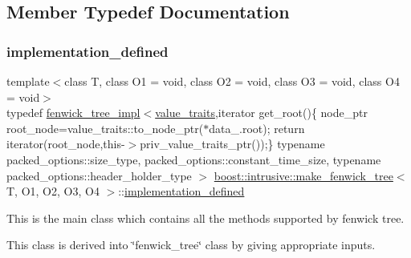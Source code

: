 \subsection{Member Typedef Documentation}
\mbox{\label{structboost_1_1intrusive_1_1make__fenwick__tree_af7a268a01bc7f0ae30cabfd6bf2be546}} 
\subsubsection{\texorpdfstring{implementation\+\_\+defined}{implementation\_defined}}
{\footnotesize\ttfamily template$<$class T, class O1 = void, class O2 = void, class O3 = void, class O4 = void$>$ \\
typedef \hyperlink{classboost_1_1intrusive_1_1fenwick__tree__impl}{fenwick\+\_\+tree\+\_\+impl}$<$\hyperlink{structboost_1_1intrusive_1_1make__fenwick__tree_a3ee00a7f2c43d65e29ad42d24f33235a}{value\+\_\+traits},iterator get\+\_\+root()\{ node\+\_\+ptr root\+\_\+node=value\+\_\+traits\+::to\+\_\+node\+\_\+ptr($\ast$data\+\_\+.\+root); return iterator(root\+\_\+node,this-\/$>$priv\+\_\+value\+\_\+traits\+\_\+ptr());\} typename packed\+\_\+options\+::size\+\_\+type, packed\+\_\+options\+::constant\+\_\+time\+\_\+size, typename packed\+\_\+options\+::header\+\_\+holder\+\_\+type $>$ \hyperlink{structboost_1_1intrusive_1_1make__fenwick__tree}{boost\+::intrusive\+::make\+\_\+fenwick\+\_\+tree}$<$ T, O1, O2, O3, O4 $>$\+::\hyperlink{structboost_1_1intrusive_1_1make__fenwick__tree_af7a268a01bc7f0ae30cabfd6bf2be546}{implementation\+\_\+defined}}


\begin{DoxyItemize}
\item This is the main class which contains all the methods supported by fenwick tree. 
\item This class is derived into \char`\"{}fenwick\+\_\+tree\char`\"{} class by giving appropriate inputs. 
\end{DoxyItemize}\mbox{\label{structboost_1_1intrusive_1_1make__fenwick__tree_affdbeb1683bbfebf917e9a35cbd31b81}} 
